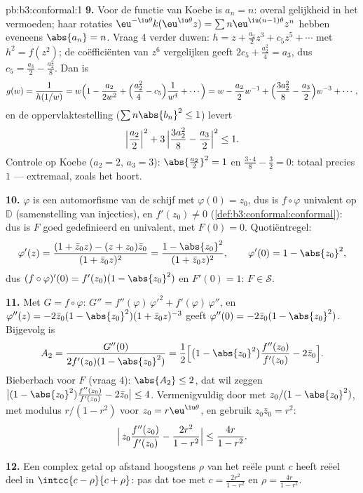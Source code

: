 \begin{solution}{pb:b3:conformal:1}
\textbf{9.} Voor de functie van Koebe is $a_n = n$: overal
gelijkheid in het vermoeden; haar rotaties
$\eu^{-\iu\theta}k(\eu^{\iu\theta}z) = \sum
n\eu^{\iu(n-1)\theta}z^n$ hebben eveneens $\abs{a_n} = n$. Vraag
4 verder duwen: $h = z + \frac{a_2}2z^3 + c_5z^5 + \cdots$ met
$h^2 = f(z^2)$; de coëfficiënten van $z^6$ vergelijken geeft
$2c_5 + \frac{a_2^2}4 = a_3$, dus $c_5 = \frac{a_3}2 -
\frac{a_2^2}8$. Dan is
\[
g(w) = \frac1{h(1/w)} = w\Bigl(1 - \frac{a_2}{2w^2} +
\Bigl(\frac{a_2^2}4 - c_5\Bigr)\frac1{w^4} + \cdots\Bigr)
= w - \frac{a_2}2w^{-1} + \Bigl(\frac{3a_2^2}8 -
\frac{a_3}2\Bigr)w^{-3} + \cdots,
\]
en de oppervlaktestelling ($\sum n\abs{b_n}^2 \leq 1$) levert
\[
\Bigl|\frac{a_2}2\Bigr|^2 + 3\,\Bigl|\frac{3a_2^2}8 -
\frac{a_3}2\Bigr|^2 \leq 1 .
\]
Controle op Koebe ($a_2 = 2$, $a_3 = 3$): $\abs{\frac{a_2}2}^2 =
1$ en $\frac{3\cdot4}8 - \frac32 = 0$: totaal precies $1$ ---
extremaal, zoals het hoort.

\textbf{10.} $\varphi$ is een automorfisme van de schijf met
$\varphi(0) = z_0$, dus is $f\circ\varphi$ univalent op $\mathbb
D$ (samenstelling van injecties), en $f'(z_0) \neq 0$
(\cref{def:b3:conformal:conformal}): dus is $F$ goed gedefinieerd
en univalent, met $F(0) = 0$. Quotiëntregel:
\[
\varphi'(z) = \frac{(1 + \bar z_0z) - (z + z_0)\bar z_0}
{(1 + \bar z_0z)^2}
= \frac{1 - \abs{z_0}^2}{(1 + \bar z_0z)^2},
\qquad \varphi'(0) = 1 - \abs{z_0}^2 ,
\]
dus $(f\circ\varphi)'(0) = f'(z_0)(1 - \abs{z_0}^2)$ en $F'(0) =
1$: $F \in \mathcal S$.

\textbf{11.} Met $G = f\circ\varphi$: $G'' =
f''(\varphi)\,\varphi'^2 + f'(\varphi)\,\varphi''$, en
$\varphi''(z) = -2\bar z_0(1 - \abs{z_0}^2)(1 + \bar
z_0z)^{-3}$ geeft $\varphi''(0) = -2\bar z_0(1 -
\abs{z_0}^2)$. Bijgevolg is
\[
A_2 = \frac{G''(0)}{2f'(z_0)(1 - \abs{z_0}^2)}
= \frac12\Bigl[\bigl(1 - \abs{z_0}^2\bigr)
\frac{f''(z_0)}{f'(z_0)} - 2\bar z_0\Bigr] .
\]
Bieberbach voor $F$ (vraag 4): $\abs{A_2} \leq 2$, dat wil zeggen
$\bigl|(1 - \abs{z_0}^2)\frac{f''(z_0)}{f'(z_0)} - 2\bar
z_0\bigr| \leq 4$. Vermenigvuldig door met $z_0/(1 -
\abs{z_0}^2)$, met modulus $r/(1 - r^2)$ voor $z_0 =
r\eu^{\iu\theta}$, en gebruik $z_0\bar z_0 = r^2$:
\[
\Bigl|\,z_0\frac{f''(z_0)}{f'(z_0)} -
\frac{2r^2}{1 - r^2}\Bigr| \leq \frac{4r}{1 - r^2} .
\]

\textbf{12.} Een complex getal op afstand hoogstens $\rho$ van
het reële punt $c$ heeft reëel deel in $\intcc{c - \rho}{c +
\rho}$: pas dat toe met $c = \frac{2r^2}{1-r^2}$ en $\rho =
\frac{4r}{1-r^2}$.


\end{solution}
